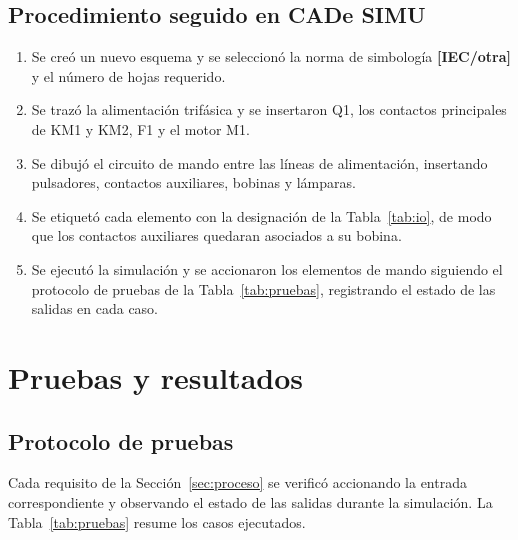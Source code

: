 \documentclass[conference,a4paper,10pt]{IEEEtran}
\begin{document}
\subsection{Procedimiento seguido en CADe SIMU}
\begin{enumerate}[leftmargin=1.6em,itemsep=1pt,topsep=2pt]
  \item Se creó un nuevo esquema y se seleccionó la norma de simbología
        \textbf{[IEC/otra]} y el número de hojas requerido.
  \item Se trazó la alimentación trifásica y se insertaron Q1, los contactos
        principales de KM1 y KM2, F1 y el motor M1.
  \item Se dibujó el circuito de mando entre las líneas de alimentación,
        insertando pulsadores, contactos auxiliares, bobinas y lámparas.
  \item Se etiquetó cada elemento con la designación de la
        Tabla~\ref{tab:io}, de modo que los contactos auxiliares quedaran
        asociados a su bobina.
  \item Se ejecutó la simulación y se accionaron los elementos de mando
        siguiendo el protocolo de pruebas de la Tabla~\ref{tab:pruebas},
        registrando el estado de las salidas en cada caso.
\end{enumerate}

\section{Pruebas y resultados}\label{sec:resultados}

\subsection{Protocolo de pruebas}
Cada requisito de la Sección~\ref{sec:proceso} se verificó accionando la
entrada correspondiente y observando el estado de las salidas durante la
simulación. La Tabla~\ref{tab:pruebas} resume los casos ejecutados.
\end{document}
